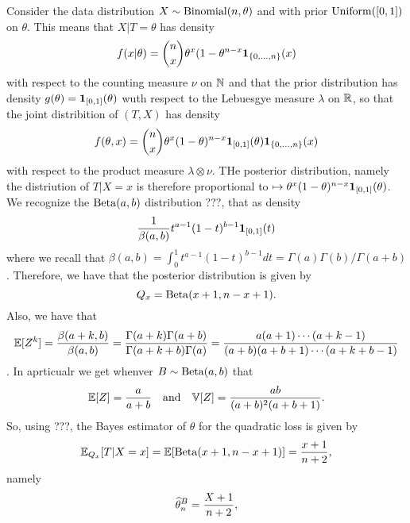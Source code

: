 Consider the data distribution $X \sim \operatorname{Binomial}(n, \theta)$ and with prior $\operatorname{Uniform}([0, 1])$ on $\theta$. This means that $X | T = \theta$ has density
\begin{equation*}
	f(x | \theta) = \binom{n}{x} \theta^x (1 - \theta^{n-x} \mathbf 1_{\{ 0, \ldots, n\}}(x)	
\end{equation*}
with respect to the counting measure $\nu$ on $\mathbb N$ and that the prior distribution has density $g(\theta) = \mathbf 1_{[0, 1]}(\theta)$ wuth respect to the Lebuesgye measure $\lambda$ on $\mathbb R$, so that the joint distribition of $(T, X)$ has density
\begin{equation*}
	f(\theta, x) = \binom{n}{x} \theta^x (1 - \theta)^{n - x} \mathbf 1_{[0, 1]}(\theta) 
	\mathbf 1_{\{ 0, \ldots, n\}}(x)
\end{equation*}
with respect to the product measure $\lambda \otimes \nu$. THe posterior distribution, namely the distriution of $T | X=x$ is therefore proportional to $\mapsto \theta^x (1 - \theta)^{n - x} \mathbf 1_{[0, 1]}(\theta)$. We recognize the $\operatorname{Beta}(a, b)$ distribution ???, that as density
\begin{equation*}
	\frac{1}{\beta(a, b)} t^{a-1} (1 - t)^{b-1} \mathbf 1_{[0, 1]}(t)
\end{equation*}
where we recall that $\beta(a, b) = \int_0^1 t^{a-1} (1 - t)^{b-1} d t = \Gamma(a) \Gamma(b)  / \Gamma(a + b)$.
Therefore, we have that the posterior distribution is given by
\begin{equation*}
	Q_x = \operatorname{Beta}(x + 1, n - x + 1).
\end{equation*}
Also, we have that
\begin{equation*}
	\mathbb E[Z^k] = \frac{\beta(a + k, b)}{\beta(a, b)} = \frac{\Gamma(a + k) \Gamma(a + b)}{\Gamma(a + k + b) \Gamma(a)} = \frac{a (a + 1) \cdots (a + k -1)}{(a + b) (a + b + 1) \cdots (a + k + b - 1)}
\end{equation*}
. In aprticualr we get whenver $B \sim \operatorname{Beta}(a, b)$ that
\begin{equation*}
	\mathbb E[Z] = \frac{a}{a + b} \quad \text{and} \quad \mathbb V[Z] = \frac{ab}{(a + b)^2 (a + b + 1)}.
\end{equation*}
So, using ???, the Bayes estimator of $\theta$ for the quadratic loss is given by 
\begin{equation*}
	\mathbb E_{Q_x}[T | X=x] = \mathbb E[ \operatorname{Beta}(x+1, n - x + 1)] = \frac{x + 1}{n + 2},
\end{equation*}
namely
\begin{equation*}
	\widehat \theta_n^B = \frac{X + 1}{n + 2},
\end{equation*}
